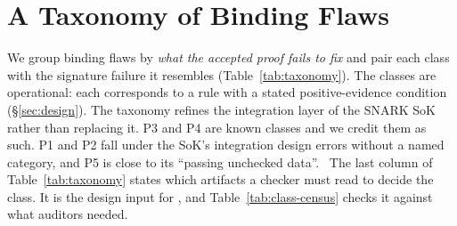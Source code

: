 \section{A Taxonomy of Binding Flaws}\label{sec:taxonomy}

We group binding flaws by \emph{what the accepted proof fails to fix} and pair
each class with the signature failure it resembles
(Table~\ref{tab:taxonomy}). The classes are operational: each corresponds to
a \tool{} rule with a stated positive-evidence condition (\S\ref{sec:design}).
The taxonomy refines the integration layer of the SNARK SoK~\cite{sok-snarks}
rather than replacing it. P3 and P4 are known classes and we credit them as
such. P1 and P2 fall under the SoK's integration design errors without a named
category, and P5 is close to its ``passing unchecked data''.%
\
The last column of Table~\ref{tab:taxonomy} states which artifacts a checker
must read to decide the class. It is the design input for \tool{}, and
Table~\ref{tab:class-census} checks it against what auditors needed.

